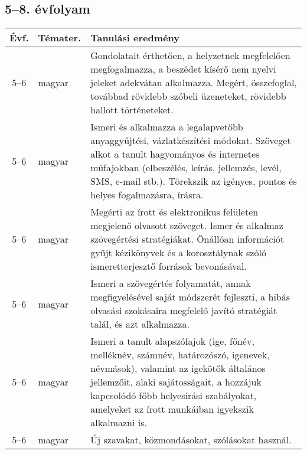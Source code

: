\subsection{5--8. évfolyam}
\begin{small}
  \begin{longtable}{c | p{2cm} |  p{11cm} }
    \textbf{Évf.} & \textbf{Témater.} & \textbf{Tanulási eredmény} \\ \hline \hline
    \endhead

              5--6 & magyar & Gondolatait érthetően, a helyzetnek megfelelően megfogalmazza, a beszédet kísérő nem nyelvi jeleket adekvátan alkalmazza. Megért, összefoglal, továbbad rövidebb szóbeli üzeneteket, rövidebb hallott történeteket. \\ \hline
              5--6 & magyar & Ismeri és alkalmazza a legalapvetőbb anyaggyűjtési, vázlatkészítési módokat. Szöveget alkot a tanult hagyományos és internetes műfajokban (elbeszélés, leírás, jellemzés, levél, SMS, e-mail stb.). Törekszik az igényes, pontos és helyes fogalmazásra, írásra. \\ \hline
              5--6 & magyar & Megérti az írott és elektronikus felületen megjelenő olvasott szöveget.
Ismer és alkalmaz szövegértési stratégiákat.
Önállóan információt gyűjt kézikönyvek és a korosztálynak szóló ismeretterjesztő források bevonásával. \\ \hline
              5--6 & magyar & Ismeri a szövegértés folyamatát, annak megfigyelésével saját módszerét fejleszti, a hibás olvasási szokásaira megfelelő javító stratégiát talál, és azt alkalmazza. \\ \hline
              5--6 & magyar & Ismeri a tanult alapszófajok (ige, főnév, melléknév, számnév, határozószó, igenevek, névmások), valamint az igekötők általános jellemzőit, alaki sajátosságait, a hozzájuk kapcsolódó főbb helyesírási szabályokat, amelyeket az írott munkáiban igyekszik alkalmazni is. \\ \hline
              5--6 & magyar & Új szavakat, közmondásokat, szólásokat használ. \\ \hline

\end{longtable}
\end{small}
